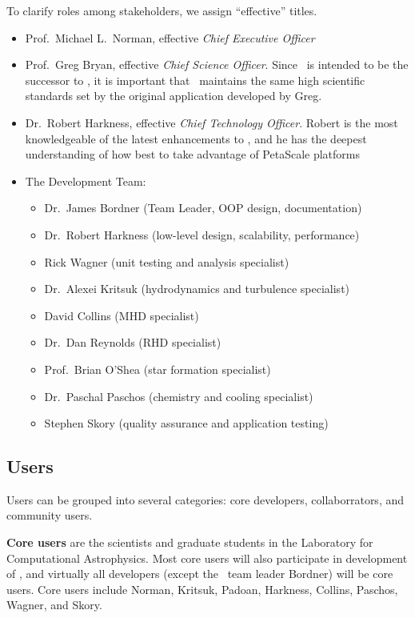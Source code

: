 \documentclass{article}
\begin{document}
To clarify roles among stakeholders, we assign ``effective'' titles.

\begin{itemize}
%
 \item  Prof.~Michael L.~Norman, effective \textit{Chief Executive Officer}
%
 \item Prof.~Greg Bryan, effective \textit{Chief Science Officer}.
 Since \cello\ is intended to be the successor to \enzo, it is
 important that \cello\ maintains the same high scientific standards
 set by the original application developed by Greg.
%
 \item Dr.~Robert Harkness, effective \textit{Chief Technology
 Officer}.  Robert is the most knowledgeable of the latest enhancements to
 \enzo, and he has the deepest understanding of how best to take advantage of
 PetaScale platforms
%
\item The Development Team:
\begin{itemize}
\item Dr.~James Bordner (Team Leader, OOP design, documentation)
\item Dr.~Robert Harkness (low-level design, scalability, performance)
\item Rick Wagner (unit testing and analysis specialist)
\item Dr.~Alexei Kritsuk (hydrodynamics and turbulence specialist)
\item David Collins (MHD specialist)
\item Dr.~Dan Reynolds (RHD specialist)
\item Prof.~Brian O'Shea (star formation specialist)
\item Dr.~Paschal Paschos (chemistry and cooling specialist)
\item Stephen Skory (quality assurance and application testing)
\end{itemize}
\end{itemize}
    

\subsection{Users}


    Users can be grouped into several categories: core developers,
    collaborrators, and community users.

    \textbf{Core users} are the scientists and graduate students in
    the Laboratory for Computational Astrophysics.  Most core users
    will also participate in development of \cello, and virtually all
    developers (except the \cello\ team leader Bordner) will be core
    users.  Core users include Norman, Kritsuk, Padoan, Harkness,
    Collins, Paschos, Wagner, and Skory.
\end{document}
